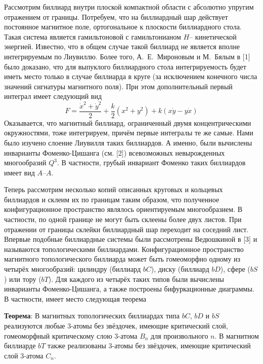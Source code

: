 
\vzmscaption

Рассмотрим биллиард внутри плоской компактной области с абсолютно упругим отражением от границы. Потребуем, что на биллиардный шар действует постоянное магнитное поле, ортогональное к плоскости биллиардного стола. Такая система является гамильтоновой с гамильтонианом $H$-- кинетической энергией. Известно, что в общем случае такой биллиард не является вполне интегрируемым по Лиувиллю. Более того, А.~Е.~Мироновым и М.~Бялым в [1] было доказано, что для выпуклого биллиардного стола интегрируемость будет иметь место только в случае биллиарда в круге (за исключением конечного числа значений сигнатуры магнитного поля). При этом дополнительный первый интеграл имеет следующий вид
$$F=\frac{\dot{x}^2+\dot{y}^2}{2}+\frac{k}{2}(x^2+y^2)+k(x\dot{y}-y\dot{x})$$
Оказывается, что магнитный биллиард, ограниченный двумя концентрическими окружностями, тоже интегрируем, причём первые интегралы те же самые. Нами было изучено слоение Лиувилля таких биллиардов. А именно, были вычислены инварианты Фоменко-Цишанга (см. [2]) всевозможных невырожденных многообразий $Q^3$. В частности, грубый инвариант Фоменко таких биллиардов имеет вид $A$--$A$.

Теперь рассмотрим несколько копий описанных круговых и кольцевых биллиардов и склеим их по границам таким образом, что полученное конфигурационное пространство являлось ориентируемым многообразием. В частности, по одной границе не могут быть склеены более двух листов. При отражении от границы склейки биллиардный шар переходит на соседний лист. Впервые подобные биллиардные системы были рассмотрены Ведюшкиной в [3] и называются топологическими биллиардами. Конфигурационное пространство магнитного топологического биллиарда может быть гомеоморфно одному из четырёх многообразий: цилиндру (биллиард $bC$), диску (биллиард $bD$), сфере ($bS$) или тору ($bT$). Для каждого из четырёх таких типов были вычислены инварианты Фоменко-Цишанга, а также построены бифуркационные диаграммы. В частности, имеет место следующая теорема

\textbf{Теорема}: В магнитных топологических биллиардах типа $bC$, $bD$ и $bS$ реализуются любые 3-атомы без звёздочек, имеющие критический слой, гомеоморфный критическому слою 3-атома $B_n$ для произвольного $n$. В магнитном биллиарде $bT$ также реализованы 3-атомы без звёздочек, имеющие критический слой 3-атома $C_n$.


